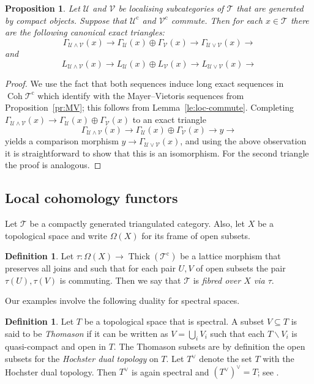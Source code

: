 \documentclass{amsart}[a4]
\newtheorem{proposition}[theorem]{Proposition}
\theoremstyle{definition}
\newtheorem{definition}[theorem]{Definition}
\theoremstyle{remark}
\numberwithin{equation}{section}
\newcommand{\Coh}{\operatorname{Coh}}
\newcommand{\Thick}{\operatorname{Thick}}
\newcommand{\lto}{\longrightarrow}
\newcommand{\cat}{\mathcal}
\let\Gamma\varGamma
\let\Omega\varOmega
\begin{document}
\begin{proposition}\label{pr:loc-MV}
  Let $\cat U$ and $\cat V$ be localising subcategories of $\cat T$
  that are generated by compact objects. Suppose that $\cat U^{\mathrm c}$ and
  $\cat V^{\mathrm c}$ commute. Then for each $x\in\cat T$ there are the
  following canonical exact triangles:
\[
  \Gamma_{\cat U\wedge\cat
    V}(x)\lto\Gamma_{\cat U}(x)\oplus\Gamma_{\cat V}(x)\lto\Gamma_{\cat U\vee\cat
    V}(x)\lto
\]
and
\[
  L_{\cat U\wedge\cat V}(x)\lto L_{\cat U}(x)\oplus L_{\cat V}(x)\lto L_{\cat
    U\vee\cat V}(x)\lto
\]
\end{proposition}
\begin{proof}
  We use the fact that both sequences induce long exact sequences in
  $\Coh\cat T^{\mathrm c}$ which identify with the Mayer--Vietoris
  sequences from Proposition~\ref{pr:MV}; this follows from
  Lemma~\ref{le:loc-commute}. Completing
  $\Gamma_{\cat U\wedge\cat V}(x)\to\Gamma_{\cat
    U}(x)\oplus\Gamma_{\cat V}(x)$ to an exact triangle
\[\Gamma_{\cat U\wedge\cat
    V}(x)\lto\Gamma_{\cat U}(x)\oplus\Gamma_{\cat V}(x)\lto y\lto\]
yields a comparison morphism $y\to\Gamma_{\cat U\vee\cat V}(x)$, and
using the above observation it is straightforward to show that this is
an isomorphism.  For the second triangle the proof is analogous.
\end{proof}

\subsection*{Local cohomology functors}

Let $\cat T$ be a compactly generated triangulated category. Also, let
$X$ be a topological space and write $\Omega(X)$ for its frame of open
subsets. 

\begin{definition}
  Let $\tau\colon\Omega(X)\to \Thick(\cat T^{\mathrm c})$ be a lattice morphism
   that preserves all joins  and such that for each pair $U,V$ of open
  subsets the pair $\tau(U),\tau(V)$ is commuting. Then we say that
  $\cat T$ is \emph{fibred over $X$ via $\tau$}.
\end{definition}

Our examples involve the following duality for spectral spaces.

\begin{definition}
  Let $T$ be a topological space that is spectral. A subset
  $V\subseteq T$ is said to be \emph{Thomason} if it can be written as
  $V=\bigcup_i V_i$ such that each $T\smallsetminus V_i$ is
  quasi-compact and open in $T$. The Thomason subsets are by
  definition the open subsets for the \emph{Hochster dual topology} on
  $T$.  Let $T^\vee$ denote the set $T$ with the Hochster dual
  topology. Then $T^\vee$ is again spectral and $(T^\vee)^\vee=T$; see
  \cite{Hochster:1969a}.
\end{definition}
\end{document}
